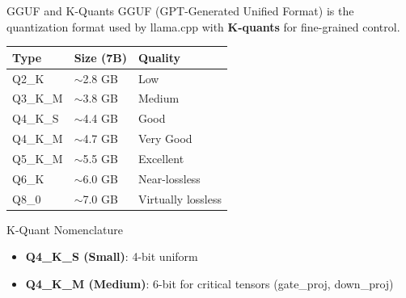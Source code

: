 \documentclass[aspectratio=169,10pt]{beamer}
\begin{document}
\begin{frame}{GGUF and K-Quants}
    GGUF (GPT-Generated Unified Format) is the quantization format used by llama.cpp with \textbf{K-quants} for fine-grained control.

    \vspace{0.3cm}
    \begin{table}
        \centering
        \small
        \begin{tabular}{lll}
            \toprule
            \textbf{Type} & \textbf{Size (7B)} & \textbf{Quality} \\
            \midrule
            Q2\_K & $\sim$2.8 GB & Low \\
            Q3\_K\_M & $\sim$3.8 GB & Medium \\
            Q4\_K\_S & $\sim$4.4 GB & Good \\
            Q4\_K\_M & $\sim$4.7 GB & Very Good \\
            Q5\_K\_M & $\sim$5.5 GB & Excellent \\
            Q6\_K & $\sim$6.0 GB & Near-lossless \\
            Q8\_0 & $\sim$7.0 GB & Virtually lossless \\
            \bottomrule
        \end{tabular}
    \end{table}

    \vspace{0.3cm}
    \begin{block}{K-Quant Nomenclature}
        \begin{itemize}
            \item \textbf{Q4\_K\_S (Small)}: 4-bit uniform
            \item \textbf{Q4\_K\_M (Medium)}: 6-bit for critical tensors (gate\_proj, down\_proj)
        \end{itemize}
    \end{block}
\end{frame}
\end{document}
